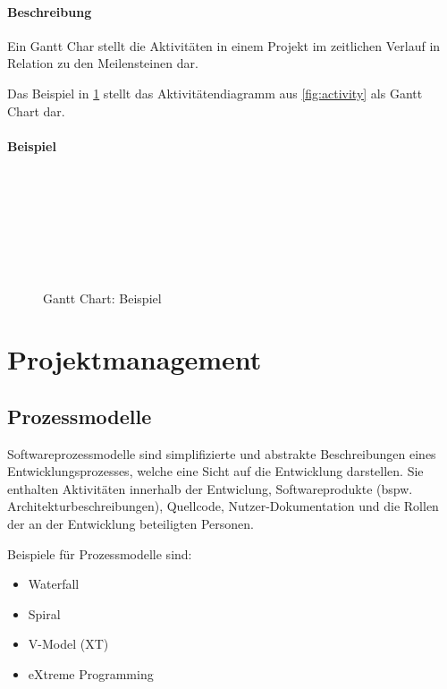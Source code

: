 			\paragraph{Beschreibung}
				Ein Gantt Char stellt die Aktivitäten in einem Projekt im zeitlichen Verlauf in Relation zu den Meilensteinen dar.
				
				Das Beispiel in \ref{fig:gantt} stellt das Aktivitätendiagramm aus \ref{fig:activity} als Gantt Chart dar.
			
			\paragraph{Beispiel}
				\begin{figure}[ht]
					\centering
					\begin{ganttchart}[vgrid]{1}{21}
						\\
						 \\
						 \\
						 \\
						 \\
						 \\
					\end{ganttchart}
					\caption{Gantt Chart: Beispiel}
					\label{fig:gantt}
				\end{figure}

	\section{Projektmanagement}
		\subsection{Prozessmodelle}
			Softwareprozessmodelle sind simplifizierte und abstrakte Beschreibungen eines Entwicklungsprozesses, welche eine Sicht auf die Entwicklung darstellen. Sie enthalten Aktivitäten innerhalb der Entwiclung, Softwareprodukte (bspw. Architekturbeschreibungen), Quellcode, Nutzer-Dokumentation und die Rollen der an der Entwicklung beteiligten Personen.
			
			Beispiele für Prozessmodelle sind:
			\begin{itemize}
				\item Waterfall
				\item Spiral
				\item V-Model (XT)
				\item eXtreme Programming
			\end{itemize}
		
